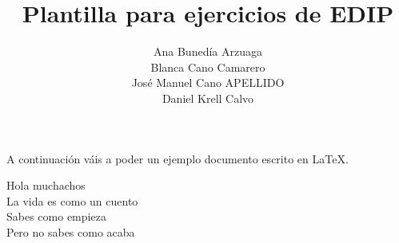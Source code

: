 \documentclass[a4paper , 11pt, spanish ]{article}
\title{Plantilla para ejercicios de EDIP}
\author{Ana Bunedía Arzuaga \\ %
Blanca Cano Camarero \\
José Manuel Cano APELLIDO \\
Daniel Krell Calvo}
\begin{document}

\maketitle

A continuación váis a poder un ejemplo  documento escrito en \LaTeX{}.

\newpage %

Hola muchachos\\
\sffamily   %
La vida es como un cuento \\
\rmfamily   %
Sabes como empieza \\
\ttfamily   %
Pero no sabes como acaba
\end{document}
